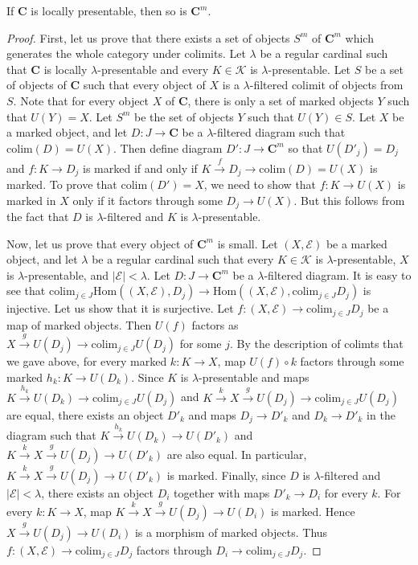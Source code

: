 \documentclass[reqno]{amsart}
\theoremstyle{definition}
\theoremstyle{remark}
\newcommand{\cat}[1]{\mathbf{#1}}
\newcommand{\C}{\cat{C}}
\newcommand{\Hom}{\mathrm{Hom}}
\newcommand{\colim}{\mathrm{colim}}
\numberwithin{figure}{section}
\begin{document}
\begin{prop}
If $\C$ is locally presentable, then so is $\C^m$.
\end{prop}
\begin{proof}
First, let us prove that there exists a set of objects $S^m$ of $\C^m$ which generates the whole category under colimits.
Let $\lambda$ be a regular cardinal such that $\C$ is locally $\lambda$-presentable and every $K \in \mathcal{K}$ is $\lambda$-presentable.
Let $S$ be a set of objects of $\C$ such that every object of $X$ is a $\lambda$-filtered colimit of objects from $S$.
Note that for every object $X$ of $\C$, there is only a set of marked objects $Y$ such that $U(Y) = X$.
Let $S^m$ be the set of objects $Y$ such that $U(Y) \in S$.
Let $X$ be a marked object, and let $D : J \to \C$ be a $\lambda$-filtered diagram such that $\colim(D) = U(X)$.
Then define diagram $D' : J \to \C^m$ so that $U(D'_j) = D_j$ and $f : K \to D_j$ is marked if and only if $K \overset{f}\to D_j \to \colim(D) = U(X)$ is marked.
To prove that $\colim(D') = X$, we need to show that $f : K \to U(X)$ is marked in $X$ only if it factors through some $D_j \to U(X)$.
But this follows from the fact that $D$ is $\lambda$-filtered and $K$ is $\lambda$-presentable.

Now, let us prove that every object of $\C^m$ is small.
Let $(X,\mathcal{E})$ be a marked object, and let $\lambda$ be a regular cardinal such that every $K \in \mathcal{K}$ is $\lambda$-presentable, $X$ is $\lambda$-presentable, and $|\mathcal{E}| < \lambda$.
Let $D : J \to \C^m$ be a $\lambda$-filtered diagram.
It is easy to see that $\colim_{j \in J} \Hom((X,\mathcal{E}), D_j) \to \Hom((X,\mathcal{E}), \colim_{j \in J} D_j)$ is injective.
Let us show that it is surjective.
Let $f : (X,\mathcal{E}) \to \colim_{j \in J} D_j$ be a map of marked objects.
Then $U(f)$ factors as $X \overset{g}\to U(D_j) \to \colim_{j \in J} U(D_j)$ for some $j$.
By the description of colimts that we gave above, for every marked $k : K \to X$, map $U(f) \circ k$ factors through some marked $h_k : K \to U(D_k)$.
Since $K$ is $\lambda$-presentable and maps $K \xrightarrow{h_k} U(D_k) \to \colim_{j \in J} U(D_j)$ and $K \overset{k}\to X \overset{g}\to U(D_j) \to \colim_{j \in J} U(D_j)$ are equal,
there exists an object $D'_k$ and maps $D_j \to D'_k$ and $D_k \to D'_k$ in the diagram such that $K \xrightarrow{h_k} U(D_k) \to U(D'_k)$ and $K \overset{k}\to X \overset{g}\to U(D_j) \to U(D'_k)$ are also equal.
In particular, $K \overset{k}\to X \overset{g}\to U(D_j) \to U(D'_k)$ is marked.
Finally, since $D$ is $\lambda$-filtered and $|\mathcal{E}| < \lambda$, there exists an object $D_i$ together with maps $D'_k \to D_i$ for every $k$.
For every $k : K \to X$, map $K \overset{k}\to X \overset{g}\to U(D_j) \to U(D_i)$ is marked.
Hence $X \overset{g}\to U(D_j) \to U(D_i)$ is a morphism of marked objects.
Thus $f : (X,\mathcal{E}) \to \colim_{j \in J} D_j$ factors through $D_i \to \colim_{j \in J} D_j$.
\end{proof}
\end{document}
